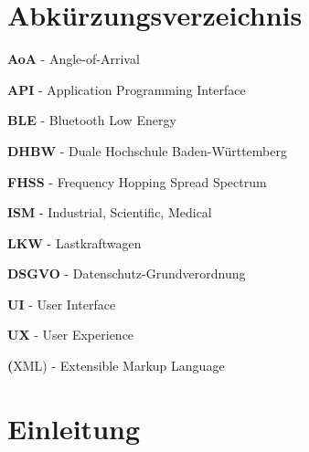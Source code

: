 \documentclass[a4paper, 12pt]{article} %
\begin{document}
\clearpage
\listoffigures

\clearpage

\section*{Abkürzungsverzeichnis}
\begin{spacing}{1.8}  %
    \fontsize{14pt}{15pt}\selectfont  %

   \textbf{AoA}  - Angle-of-Arrival

   \textbf{API} - Application Programming Interface

   \textbf{BLE} - Bluetooth Low Energy

   \textbf{DHBW} - Duale Hochschule Baden-Württemberg

   \textbf{FHSS} - Frequency Hopping Spread Spectrum

   \textbf{ISM} - Industrial, Scientific, Medical

   \textbf{LKW} - Lastkraftwagen

   \textbf{DSGVO} - Datenschutz-Grundverordnung

   \textbf{UI} - User Interface

   \textbf{UX} - User Experience

   \textbf(XML) - Extensible Markup Language


\end{spacing}

\clearpage


\tableofcontents

\clearpage

\setcounter{page}{1}

\section{Einleitung}
\begin{spacing}{1.8}  %
    \fontsize{14pt}{15pt}\selectfont  %

\end{spacing}
\end{document}
